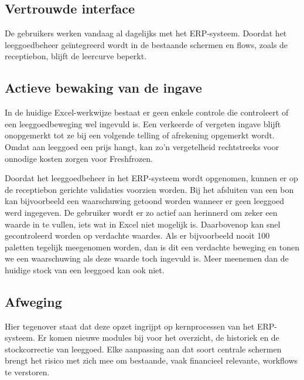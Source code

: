 \subsection{Vertrouwde interface}

De gebruikers werken vandaag al dagelijks met het ERP-systeem. Doordat het leeggoedbeheer geïntegreerd wordt in de bestaande schermen en flows, zoals de receptiebon, blijft de leercurve beperkt.

\subsection{Actieve bewaking van de ingave}

In de huidige Excel-werkwijze bestaat er geen enkele controle die controleert of een leeggoedbeweging wel ingevuld is. Een verkeerde of vergeten ingave blijft onopgemerkt tot ze bij een volgende telling of afrekening opgemerkt wordt. Omdat aan leeggoed een prijs hangt, kan zo'n vergetelheid rechtstreeks voor onnodige kosten zorgen voor Freshfrozen.

Doordat het leeggoedbeheer in het ERP-systeem wordt opgenomen, kunnen er op de receptiebon gerichte validaties voorzien worden. Bij het afsluiten van een bon kan bijvoorbeeld een waarschuwing getoond worden wanneer er geen leeggoed werd ingegeven. De gebruiker wordt er zo actief aan herinnerd om zeker een waarde in te vullen, iets wat in Excel niet mogelijk is. 
Daarbovenop kan snel gecontroleerd worden op verdachte waardes. Als er bijvoorbeeld nooit 100 paletten tegelijk meegenomen worden, dan is dit een verdachte beweging en tonen we een waarschuwing als deze waarde toch ingevuld is. Meer meenemen dan de huidige stock van een leeggoed kan ook niet.

\subsection{Afweging}

Hier tegenover staat dat deze opzet ingrijpt op kernprocessen van het ERP-systeem. Er komen nieuwe modules bij voor het overzicht, de historiek en de stockcorrectie van leeggoed. Elke aanpassing aan dat soort centrale schermen brengt het risico met zich mee om bestaande, vaak financieel relevante, workflows te verstoren.
